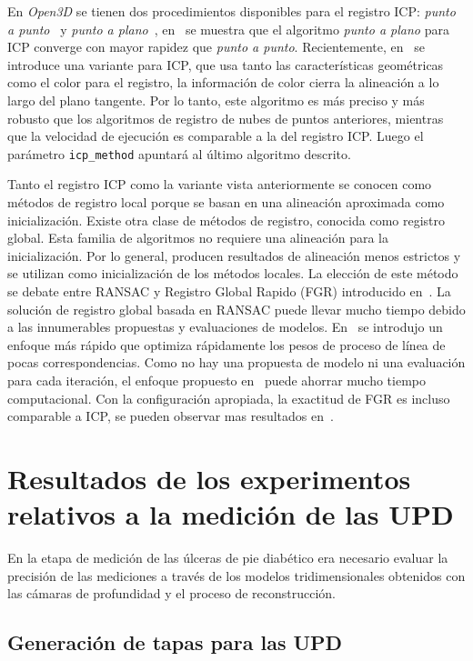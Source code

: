En \textit{Open3D} se tienen dos procedimientos disponibles para el registro ICP: \textit{punto a punto}~\cite{besl1992method}  y \textit{punto a plano}~\cite{chen1992object}, en~\cite{rusinkiewicz2001efficient} se muestra que el algoritmo \textit{punto a plano} para ICP converge con mayor rapidez que \textit{punto a punto}. Recientemente, en~\cite{park2017colored} se introduce una variante para ICP, que usa tanto las características geométricas como el color para el registro, la información de color cierra la alineación a lo largo del plano tangente. Por lo tanto, este algoritmo es más preciso y más robusto que los algoritmos de registro de nubes de puntos anteriores, mientras que la velocidad de ejecución es comparable a la del registro ICP. Luego el parámetro \verb|icp_method| apuntará al último algoritmo descrito.

Tanto el registro ICP como la variante vista anteriormente se conocen como métodos de registro local porque se basan en una alineación aproximada como inicialización. Existe otra clase de métodos de registro, conocida como registro global. Esta familia de algoritmos no requiere una alineación para la inicialización. Por lo general, producen resultados de alineación menos estrictos y se utilizan como inicialización de los métodos locales. La elección de este método se debate entre RANSAC y Registro Global Rapido (FGR) introducido en~\cite{zhou2016fast}. La solución de registro global basada en RANSAC puede llevar mucho tiempo debido a las innumerables propuestas y evaluaciones de modelos. En~\cite{zhou2016fast} se introdujo un enfoque más rápido que optimiza rápidamente los pesos de proceso de línea de pocas correspondencias. Como no hay una propuesta de modelo ni una evaluación para cada iteración, el enfoque propuesto en~\cite{zhou2016fast} puede ahorrar mucho tiempo computacional. Con la configuración apropiada, la exactitud de FGR es incluso comparable a ICP, se pueden observar mas resultados en~\cite{zhou2016fast}.

\section{Resultados de los experimentos relativos a la medición de las UPD}

En la etapa de medición de las úlceras de pie diabético era necesario evaluar la precisión de las mediciones a través de los modelos tridimensionales obtenidos con las cámaras de profundidad y el proceso de reconstrucción. 

\subsection{Generación de tapas para las UPD}

